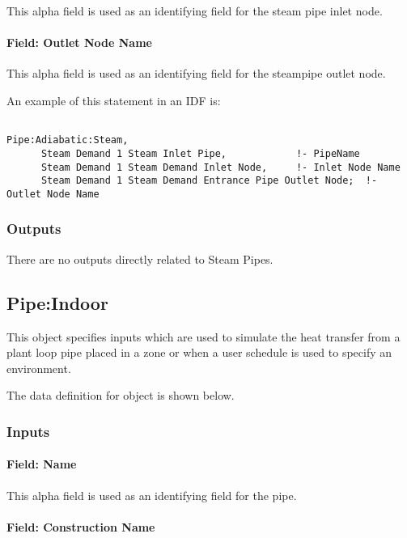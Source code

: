 This alpha field is used as an identifying field for the steam pipe inlet node.

\paragraph{Field: Outlet Node Name}\label{field-outlet-node-name-1-001}

This alpha field is used as an identifying field for the steampipe outlet node.

An example of this statement in an IDF is:

\begin{lstlisting}

Pipe:Adiabatic:Steam,
      Steam Demand 1 Steam Inlet Pipe,            !- PipeName
      Steam Demand 1 Steam Demand Inlet Node,     !- Inlet Node Name
      Steam Demand 1 Steam Demand Entrance Pipe Outlet Node;  !- Outlet Node Name
\end{lstlisting}

\subsubsection{Outputs}\label{outputs-5-005}

There are no outputs directly related to Steam Pipes.

\subsection{Pipe:Indoor}\label{pipeindoor}

This object specifies inputs which are used to simulate the heat transfer from a plant loop pipe placed in a zone or when a user schedule is used to specify an environment.

The data definition for object is shown below.

\subsubsection{Inputs}\label{inputs-6-014}

\paragraph{Field: Name}\label{field-name-6-011}

This alpha field is used as an identifying field for the pipe.

\paragraph{Field: Construction Name}\label{field-construction-name-002}

